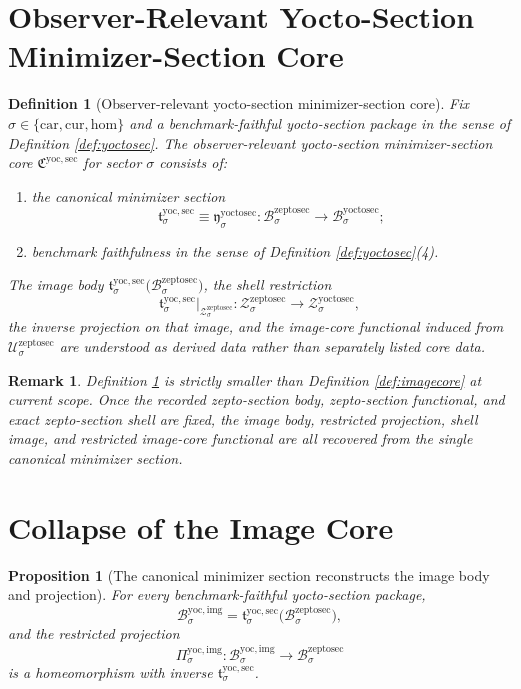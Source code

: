 \documentclass[11pt]{article}
\newcommand{\Car}{\mathrm{car}}
\newcommand{\Cur}{\mathrm{cur}}
\newcommand{\Hom}{\mathrm{hom}}
\newcommand{\ZeptoSectionBody}[1]{\mathcal B_{#1}^{\mathrm{zeptosec}}}
\newcommand{\ZeptoSectionFunctional}[1]{\mathscr U_{#1}^{\mathrm{zeptosec}}}
\newcommand{\ZeptoSectionShell}[1]{\mathcal Z_{#1}^{\mathrm{zeptosec}}}
\newcommand{\YoctoSectionBody}[1]{\mathcal B_{#1}^{\mathrm{yoctosec}}}
\newcommand{\YoctoSectionZeptoMin}[1]{\mathfrak y_{#1}^{\mathrm{yoctosec}}}
\newcommand{\YoctoSectionShell}[1]{\mathcal Z_{#1}^{\mathrm{yoctosec}}}
\newcommand{\YoctoImgBody}[1]{\mathcal B_{#1}^{\mathrm{yoc,img}}}
\newcommand{\YoctoImgProj}[1]{\Pi_{#1}^{\mathrm{yoc,img}}}
\newcommand{\YoctoMinSectionCore}{\mathfrak C^{\mathrm{yoc,sec}}}
\newcommand{\YoctoMinSection}[1]{\mathfrak t_{#1}^{\mathrm{yoc,sec}}}
\newtheorem{definition}{Definition}
\newtheorem{proposition}{Proposition}
\newtheorem{remark}{Remark}
\begin{document}
\section{Observer-Relevant Yocto-Section Minimizer-Section Core}

\begin{definition}[Observer-relevant yocto-section minimizer-section core]
\label{def:sectioncore}
Fix \(\sigma\in\{\Car,\Cur,\Hom\}\) and a benchmark-faithful yocto-section package in the sense of Definition \ref{def:yoctosec}. The \emph{observer-relevant yocto-section minimizer-section core} \(\YoctoMinSectionCore\) for sector \(\sigma\) consists of:
\begin{enumerate}
    \item the canonical minimizer section
    \[
    \YoctoMinSection{\sigma}
    \equiv
    \YoctoSectionZeptoMin{\sigma}
    :
    \ZeptoSectionBody{\sigma}\to\YoctoSectionBody{\sigma};
    \]
    \item benchmark faithfulness in the sense of Definition \ref{def:yoctosec}(4).
\end{enumerate}
The image body \(\YoctoMinSection{\sigma}\bigl(\ZeptoSectionBody{\sigma}\bigr)\), the shell restriction
\[
\YoctoMinSection{\sigma}\big|_{\ZeptoSectionShell{\sigma}}
:
\ZeptoSectionShell{\sigma}\to\YoctoSectionShell{\sigma},
\]
the inverse projection on that image, and the image-core functional induced from \(\ZeptoSectionFunctional{\sigma}\) are understood as derived data rather than separately listed core data.
\end{definition}

\begin{remark}
Definition \ref{def:sectioncore} is strictly smaller than Definition \ref{def:imagecore} at current scope. Once the recorded zepto-section body, zepto-section functional, and exact zepto-section shell are fixed, the image body, restricted projection, shell image, and restricted image-core functional are all recovered from the single canonical minimizer section.
\end{remark}

\section{Collapse of the Image Core}

\begin{proposition}[The canonical minimizer section reconstructs the image body and projection]
\label{prop:reconstructbody}
For every benchmark-faithful yocto-section package,
\[
\YoctoImgBody{\sigma}
=
\YoctoMinSection{\sigma}\bigl(\ZeptoSectionBody{\sigma}\bigr),
\]
and the restricted projection
\[
\YoctoImgProj{\sigma}:\YoctoImgBody{\sigma}\to\ZeptoSectionBody{\sigma}
\]
is a homeomorphism with inverse \(\YoctoMinSection{\sigma}\).
\end{proposition}
\end{document}
